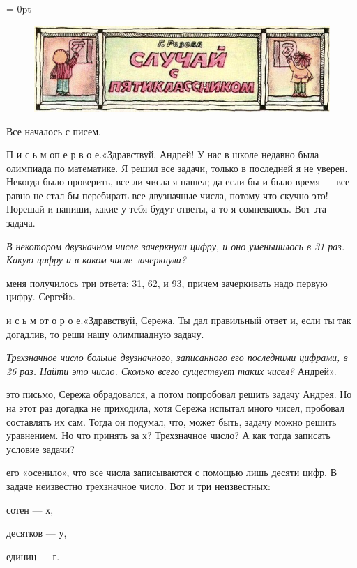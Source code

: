 \thispagestyle{fancy}
\fancyhf{}
\fancyfoot[L]{\thepage}
\renewcommand{\headrulewidth}{0pt}
\renewcommand{\footrulewidth}{0pt}
\footskip = 0pt

\setcounter{page}{48}
\begin{figure}[ht!]
\centering
\includegraphics[width=0.95\linewidth]{picture.jpg}
\end{figure}
\begin{minipage}[bs]{0.44\textwidth}
Все началось с писем.

\quad П и с ь м о\quad п е р в о е.\qquad«Здравствуй, Андрей! У нас в школе недавно была олимпиада по математике. Я решил все задачи, только в последней я не уверен. Некогда было проверить, все ли числа я нашел; да если бы и было время — все равно не стал бы перебирать все двузначные числа, потому что скучно это! Порешай и напиши, какие у тебя будут ответы, а то я сомневаюсь. Вот эта задача.

\qquad\textit{В некотором двузначном числе зачеркнули цифру, и оно уменьшилось в 31 раз. Какую цифру и в каком числе зачеркнули?}

 меня получилось три ответа: 31, 62, и 93, причем зачеркивать надо первую цифру. Сергей».


 и с ь м о т о р о е.\quad«Здравствуй, Сережа. Ты дал правильный ответ и, если ты так догадлив, то реши нашу олимпиадную задачу.

\qquad\textit{Трехзначное число больше двузначного, записанного его последними цифрами, в 26 раз. Найти это число.
Сколько всего существует таких чисел?} Андрей».

 это письмо, Сережа обрадовался, а потом попробовал решить задачу Андрея. Но на этот раз догадка не приходила, хотя Сережа испытал много чисел, пробовал составлять их сам. Тогда он подумал, что, может быть, задачу можно решить уравнением. Но что принять за х? Трехзначное число? А как тогда записать условие задачи?

 его «осенило», что все числа записываются с помощью лишь десяти цифр. В задаче неизвестно трехзначное число. Вот и три неизвестных:

 сотен — х,

 десятков — у,

 единиц — г.
\end{minipage}
